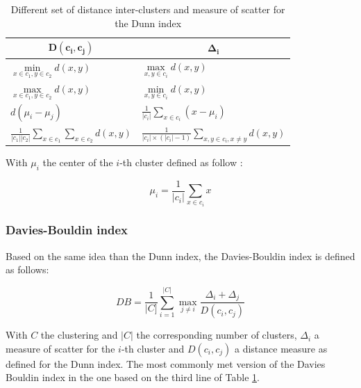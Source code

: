 \documentclass[a4paper]{report}
\begin{document}
    {\setlength{\extrarowheight}{10pt}%
    \begin{table}[h]
    \centering
    \begin{tabular}{|l|l|}
    \hline
    \multicolumn{1}{|c|}{$\mathbf{D(c_i, c_j)}$}                   & \multicolumn{1}{c|}{$\mathbf{\Delta_i}$}                                   \\ [10pt] \hline
    $\min\limits_{x \in c_1, y \in c_2} d(x, y)$                           & $\max\limits_{x, y \in c_i} d(x,y)$                                                       \\ [10pt] \hline
    $\max\limits_{x \in c_1, y \in c_2} d(x, y)$                           & $\min\limits_{x, y \in c_i} d(x,y)$                                                       \\ [10pt] \hline
    $d(\mu_i - \mu_j)$                                             & $\frac{1}{|c_i|}\sum_{x \in c_i}(x - \mu_i)$                               \\ [10pt] \hline
    $\frac{1}{|c_1||c_2|}\sum\limits_{x \in c_1}\sum\limits_{x \in c_2} d(x, y)$ & $\frac{1}{|c_i| \times (|c_i| - 1)} \sum\limits_{x, y \in c_i, x \neq y} d(x, y)$ \\ [10pt] \hline
    \end{tabular}
    \caption{Different set of distance inter-clusters and measure of scatter for the Dunn index}
    \label{tab:all_dunn_index}
    \end{table}}

    With $\mu_i$ the center of the $i$-th cluster defined as follow :

    \begin{equation}
        \mu_i = \frac{1}{|c_i|}\sum_{x \in c_i}x
        \label{eq:mui}
    \end{equation}

    \subsubsection{Davies-Bouldin index}
    Based on the same idea than the Dunn index, the Davies-Bouldin index is defined as follows:

    \begin{equation}
DB = \frac{1}{|C]}\sum_{i=1}^{|C|} \max_{j \neq i} \frac{\Delta_i + \Delta_j}{D(c_i,c_j)}
        \label{eq:db_index}
    \end{equation}

    With $C$ the clustering and $|C|$ the corresponding number of clusters, $\Delta_i$ a measure of scatter for the $i$-th cluster and $D(c_i, c_j)$ a distance measure as defined for the Dunn index. The most commonly met version of the Davies Bouldin index in the one based on the third line of Table \ref{tab:all_dunn_index}.
\end{document}
